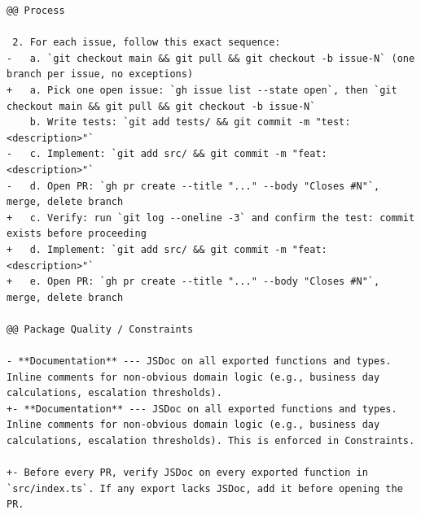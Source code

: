 \begin{lstlisting}[language={},basicstyle=\ttfamily\small,breaklines=true,
    frame=single,captionpos=b,
    caption={Ukazka dalsiho zpresneni \texttt{AGENTS.md} (pilot-r2 $\rightarrow$ pilot-r3)}]
@@ Process

 2. For each issue, follow this exact sequence:
-   a. `git checkout main && git pull && git checkout -b issue-N` (one branch per issue, no exceptions)
+   a. Pick one open issue: `gh issue list --state open`, then `git checkout main && git pull && git checkout -b issue-N`
    b. Write tests: `git add tests/ && git commit -m "test: <description>"`
-   c. Implement: `git add src/ && git commit -m "feat: <description>"`
-   d. Open PR: `gh pr create --title "..." --body "Closes #N"`, merge, delete branch
+   c. Verify: run `git log --oneline -3` and confirm the test: commit exists before proceeding
+   d. Implement: `git add src/ && git commit -m "feat: <description>"`
+   e. Open PR: `gh pr create --title "..." --body "Closes #N"`, merge, delete branch

@@ Package Quality / Constraints

- **Documentation** --- JSDoc on all exported functions and types. Inline comments for non-obvious domain logic (e.g., business day calculations, escalation thresholds).
+- **Documentation** --- JSDoc on all exported functions and types. Inline comments for non-obvious domain logic (e.g., business day calculations, escalation thresholds). This is enforced in Constraints.

+- Before every PR, verify JSDoc on every exported function in `src/index.ts`. If any export lacks JSDoc, add it before opening the PR.
\end{lstlisting}
